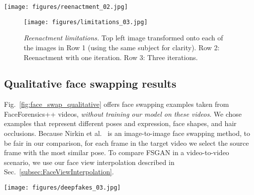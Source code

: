 \begin{figure*}[t]
\centering
\texttt{[image: figures/reenactment\_02.jpg]}
\caption{ \emph{Qualitative face reenactment results.} Row 1: The source face for reenactment. Row 2: Our reenactment results (without background removal). Row 3: The target face from which to transfer the pose and expression.  \vspace{-4mm} }%
\label{fig:face_reenactment_qualitative}%
\end{figure*}

\begin{figure}[!htbp]
\centering
\texttt{[image: figures/limitations\_03.jpg]}
\caption{ \emph{Reenactment limitations.} Top left image transformed onto each of the images in Row 1 (using the same subject for clarity). Row 2: Reenactment with one iteration. Row 3: Three iterations.}%
\label{fig:reenactment_limitations}\vspace{-5mm}%
\end{figure}

\subsection{Qualitative face swapping results}
Fig.~\ref{fig:face_swap_qualitative} offers face swapping examples taken from FaceForensics++ videos, {\em without training our model on these videos}. We chose examples that represent different poses and expression, face shapes, and hair occlusions. Because Nirkin et al.~\cite{nirkin2018face} is an image-to-image face swapping method, to be fair in our comparison, for each frame in the target video we select the source frame with the most similar pose. To compare FSGAN in a video-to-video scenario, we use our face view interpolation described in Sec.~\ref{subsec:FaceViewInterpolation}.

\begin{figure*}[tb]
\centering
\texttt{[image: figures/deepfakes\_03.jpg]}
\caption{ \emph{Qualitative face swapping results on~\cite{roessler2019faceforensics++}.} Results for source photo swapped onto target provided for Nirkin et al.~\cite{nirkin2018face}, DeepFakes~\cite{DeepFakes} and our method on images of faces of subjects it was not trained on.  }%
\label{fig:face_swap_qualitative}\vspace{-5mm}%
\end{figure*}

